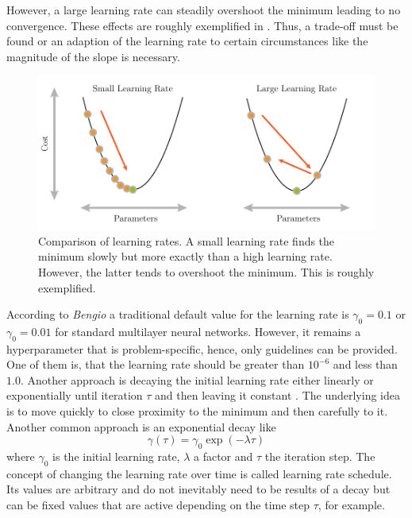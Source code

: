 However, a large learning rate can steadily overshoot the minimum leading to no convergence.
These effects are roughly exemplified in .
Thus, a trade-off must be found or an adaption of the learning rate to certain circumstances like the magnitude of the slope is necessary.
\begin{figure}
	\centering
	\includegraphics[]{images/gradient_descent_learning_rate.pdf}
	\caption[Comparison of learning rates]{Comparison of learning rates. A small learning rate finds the minimum slowly but more exactly than a high learning rate. However, the latter tends to overshoot the minimum. This is roughly exemplified.}
	\label{fig:learning-rate}
\end{figure}
According to \textit{Bengio} \cite{DBLP:journals/corr/abs-1206-5533} a traditional default value for the learning rate is $\gamma_0 = 0.1$ or $\gamma_0 = 0.01$ for standard multilayer neural networks.
However, it remains a hyperparameter that is problem-specific, hence, only guidelines can be provided.
One of them is, that the learning rate should be greater than $10^{-6}$ and less than $1.0$.
Another approach is decaying the initial learning rate either linearly or exponentially until iteration $\tau$ and then leaving it constant \cite{Goodfellow-et-al-2016}.
The underlying idea is to move quickly to close proximity to the minimum and then carefully to it.
Another common approach is an exponential decay like
\begin{equation}
	\gamma(\tau) = \gamma_0 \exp(-\lambda\tau)
\end{equation}
where $\gamma_0$ is the initial learning rate, $\lambda$ a factor and $\tau$ the iteration step.
The concept of changing the learning rate over time is called learning rate schedule. Its values are arbitrary and do not inevitably need to be results of a decay but can be fixed values that are active depending on the time step $\tau$, for example.

